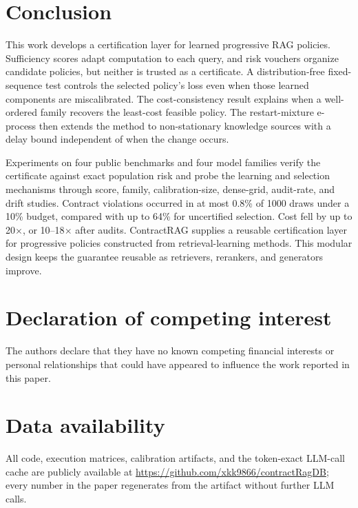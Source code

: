 \documentclass[a4paper,fleqn]{cas-dc}
\begin{document}
\maketitle









\section{Conclusion}
\label{sec:conclusion}
This work develops a certification layer for learned progressive RAG
policies. Sufficiency scores adapt computation to each query, and risk
vouchers organize candidate policies, but neither is trusted as a
certificate. A distribution-free fixed-sequence test controls the
selected policy's loss even when those learned components are
miscalibrated. The cost-consistency result explains when a well-ordered
family recovers the least-cost feasible policy. The restart-mixture
e-process then extends the method to non-stationary knowledge sources
with a delay bound independent of when the change occurs.

Experiments on four public benchmarks and four model families verify
the certificate against exact population risk and probe the
learning and selection mechanisms through score, family,
calibration-size, dense-grid, audit-rate, and drift studies. Contract
violations occurred in at most 0.8\% of 1000 draws under a 10\% budget,
compared with up to 64\% for uncertified selection. Cost fell by up to
20$\times$, or 10--18$\times$ after audits. ContractRAG supplies a
reusable certification layer for progressive policies constructed from
retrieval-learning methods. This modular design keeps the guarantee
reusable as retrievers,
rerankers, and generators improve.

\section*{Declaration of competing interest}
The authors declare that they have no known competing financial
interests or personal relationships that could have appeared to
influence the work reported in this paper.

\section*{Data availability}
All code, execution matrices, calibration artifacts, and the
token-exact LLM-call cache are publicly available at
\url{https://github.com/xkk9866/contractRagDB}; every number in the
paper regenerates from the artifact without further LLM calls.
\end{document}
